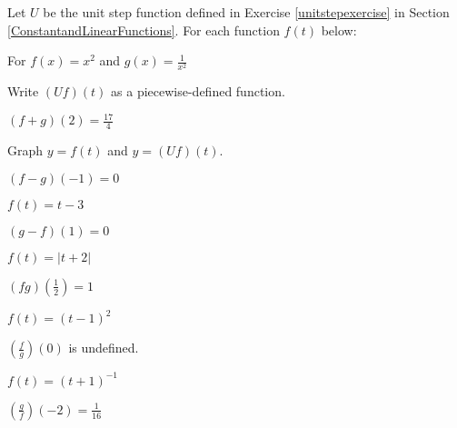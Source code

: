 \documentclass{ximera}
\begin{document}
\begin{question}
Let $U$ be the unit step function defined in Exercise \ref{unitstepexercise} in Section \ref{ConstantandLinearFunctions}.  For each function $f(t)$ below:

\begin{solution}
For  $f(x) = x^2$ and $g(x) = \frac{1}{x^2}$


\end{solution}

\end{question}

\begin{question}
Write $(Uf)(t)$ as a piecewise-defined function.
\begin{solution}
$(f+g)(2) =\frac{17}{4}$
\end{solution}

\end{question}

\begin{question}
Graph $y = f(t)$ and $y = (Uf)(t)$.

\begin{solution}
$(f-g)(-1) = 0$
\end{solution}

\end{question}

\begin{question}
$f(t) = t-3$
\begin{solution}
$(g-f)(1) = 0$

\end{solution}

\end{question}

\begin{question}
$f(t) = |t+2|$
\begin{solution}
$(fg)\left(\frac{1}{2}\right) =1$
\end{solution}

\end{question}

\begin{question}
$f(t) =(t-1)^2$



\begin{solution}
$\left(\frac{f}{g}\right)(0)$ is undefined.
\end{solution}

\end{question}

\begin{question}
$f(t) =(t+1)^{-1}$
\begin{solution}
$\left(\frac{g}{f}\right)\left(-2\right) = \frac{1}{16}$

\end{solution}

\end{question}
\end{document}
